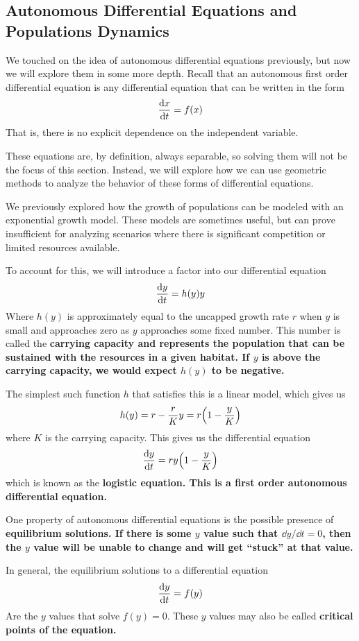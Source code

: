 \subsection{Autonomous Differential Equations and Populations Dynamics}
We touched on the idea of autonomous differential equations previously, but now we will explore them in some more depth. Recall that an autonomous first order differential equation is any differential equation that can be written in the form
\[ \dv{x}{t} = f(x) \]
That is, there is no explicit dependence on the independent variable. \par
These equations are, by definition, always separable, so solving them will not be the focus of this section. Instead, we will explore how we can use geometric methods to analyze the behavior of these forms of differential equations.
\begin{example}
    We previously explored how the growth of populations can be modeled with an exponential growth model. These models are sometimes useful, but can prove insufficient for analyzing scenarios where there is significant competition or limited resources available. \par
    To account for this, we will introduce a factor into our differential equation
    \[ \dv{y}{t} = h(y)y \]
    Where $h(y)$ is approximately equal to the uncapped growth rate $r$ when $y$ is small and approaches zero as $y$ approaches some fixed number. This number is called the \bf{carrying capacity} and represents the population that can be sustained with the resources in a given habitat. If $y$ is above the carrying capacity, we would expect $h(y)$ to be negative. \par
    The simplest such function $h$ that satisfies this is a linear model, which gives us
    \[ h(y) = r - \frac{r}{K}y = r\pqty{1 - \frac{y}{K}}\]
    where $K$ is the carrying capacity. This gives us the differential equation
    \[ \dv{y}{t} = ry\pqty{1-\frac{y}{K}} \]
    which is known as the \bf{logistic equation}. This is a first order autonomous differential equation. \par
    One property of autonomous differential equations is the possible presence of \bf{equilibrium solutions}. If there is some $y$ value such that $\dd y/ \dd t = 0$, then the $y$ value will be unable to change and will get ``stuck'' at that value. \par
    In general, the equilibrium solutions to a differential equation
    \[ \dv{y}{t} = f(y) \]
    Are the $y$ values that solve $f(y)=0$. These $y$ values may also be called \bf{critical points} of the equation. \par

\end{example}
